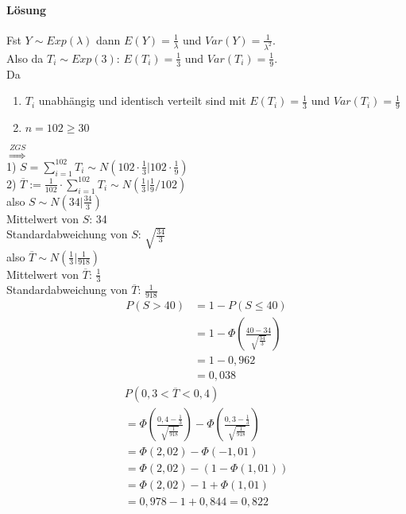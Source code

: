 \documentclass[10pt,a4paper,landscape]{article}
\begin{document}
\begin{multicols*}{4}
	\paragraph{Lösung} Fst $Y \sim Exp(\lambda)$ dann 
	$E(Y) = \frac{1}{\lambda}$ und $Var(Y) = \frac{1}{\lambda^2}$. \\
	Also da $T_i \sim Exp(3)$: $E(T_i) = \frac{1}{3}$ und 
	$Var(T_i) = \frac{1}{9}$. \\
	Da 
	\begin{enumerate}
		\item $T_i$ unabhängig und identisch verteilt sind mit 
		$E(T_i) = \frac{1}{3}$ und $Var(T_i) = \frac{1}{9}$
		\item $n=102 \geq 30$
	\end{enumerate}
	$\stackrel{ZGS}{\Rightarrow}$ \\
	1) $S = \sum \limits_{i=1}^{102} T_i \sim N(102\cdot \frac{1}{3}|102\cdot \frac{1}{9})$ \\
	2) $\overline{T} := \frac{1}{102} \cdot \sum \limits_{i=1}^{102} T_i \sim N(\frac{1}{3}|\frac{1}{9} / 102)$ \\
	also $S \sim N(34|\frac{34}{3})$ \\
	Mittelwert von $S$: 34 \\
	Standardabweichung von $S$: $\sqrt{\frac{34}{3}}$ \\
	also $\overline{T} \sim N(\frac{1}{3}|\frac{1}{918})$ \\
	Mittelwert von $\overline{T}$: $\frac{1}{3}$ \\
	Standardabweichung von $\overline{T}$: $\frac{1}{918}$ \\
	\begin{align*} 
		P(S>40) &= 1-P(S\leq 40) \\ 
				&= 1-\Phi\left(\frac{40-34}{\sqrt{\frac{34}{3}}}\right) \\
				&= 1-0,962 \\
				&= 0,038
	\end{align*}
	\begin{align*} 
		P(0,3 < \overline{T} < 0,4) \\
		= \Phi\left(\frac{0,4-\frac{1}{3}}{\sqrt{\frac{1}{918}}}\right) - \Phi\left(\frac{0,3-\frac{1}{3}}{\sqrt{\frac{1}{918}}}\right) \\ 
		= \Phi(2,02) - \Phi(-1,01) \\
		= \Phi(2,02) - (1-\Phi(1,01)) \\
		= \Phi(2,02) - 1 + \Phi(1,01) \\
		= 0,978 - 1 + 0,844 = 0,822
	\end{align*}
\end{multicols*}
\end{document}
